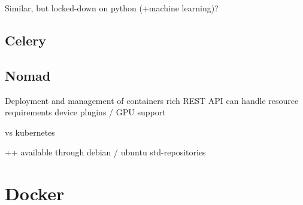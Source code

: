 Similar, but locked-down on python  (+machine learning)?
\cite{luigi:etc:distributed_pipelines}

\subsection{Celery}

\cite{celery:main}

\subsection{Nomad}


\cite{nomad:main}
Deployment and management of containers
rich REST API
can handle resource requirements
device plugins / GPU support

vs kubernetes \cite{nomad:vs:kubernetes}

++ available through debian / ubuntu std-repositories

\section{Docker}
